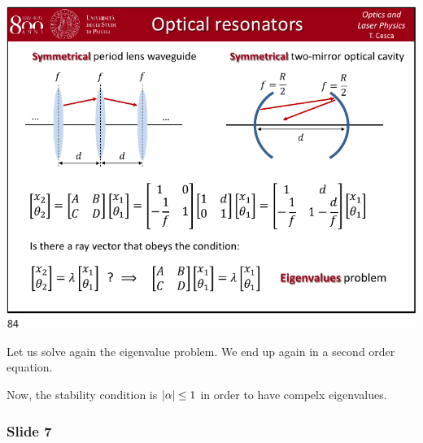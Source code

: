 \documentclass[../main/main.tex]{subfiles}
\begin{document}
\begin{minipage}[]{0.5\linewidth}
\centering
\includegraphics[page=6,width=1\textwidth]{../lessons/pdf_file/21_lecture.pdf}
\end{minipage}
\hspace{0.3cm}\vspace{0.3cm}
\begin{minipage}[c]{0.47\linewidth}

Let us solve again the eigenvalue problem. We end up again in a second order equation.

Now, the stability condition is \( \abs{\alpha }\le 1  \) in order to have compelx eigenvalues.

\end{minipage}

\newpage

\subsubsection*{Slide 7}
\end{document}
